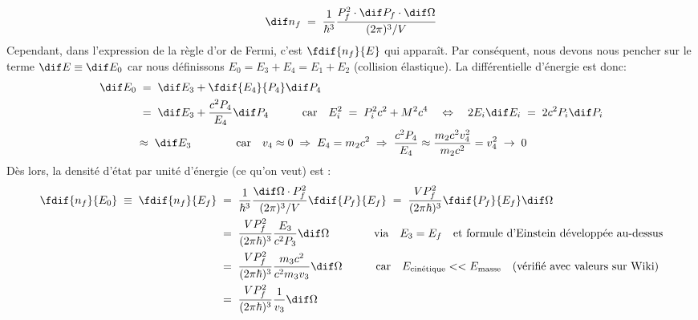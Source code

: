 \[
    \dif n_f \eq \dfrac{1}{\hbar^3}\dfrac{P^{2}_f \cdot \dif P_f \cdot \dif\Omega}{(2\pi)^3 / V}
\]
 Cependant, dans l'expression de la règle d'or de Fermi, c'est $ \fdif{n_f}{E}$ qui apparaît. Par conséquent, nous devons nous pencher sur le terme $\dif E\equiv \dif E_0$ car nous définissons $E_0 = E_3 + E_4 = E_1 + E_2$ (collision élastique). La différentielle d'énergie est donc:
\begin{align*}
    \dif E_0 
        &\eq 
    \dif E_3 + \fdif{E_4}{P_4}\dif P_4\\
        &\eq
    \dif E_3 + \dfrac{c^2 P_4}{E_4}\dif P_4 
    \qquad \quad \text{car} \quad
    E_i^2 \eq P_i^2c^2 + M^2c^4
    \quad \Leftrightarrow \quad
    2E_i\dif E_i \eq 2c^2 P_i \dif P_i\\
        &\approx\;
    \dif E_3  \qquad \qquad \text{car} \quad v_4 \approx 0 \;\Rightarrow\; E_4 = m_2c^2 \;\Rightarrow\; \dfrac{c^2P_4}{E_4} \approx \dfrac{m_2c^2v_4^2}{m_2c^2} = v_4^2 \;\rightarrow\; 0
\end{align*}
Dès lors, la densité d'état par unité d'énergie (ce qu'on veut) est :
\begin{align*}
    \fdif{n_f}{E_0} \;\equiv\; \fdif{n_f}{E_f}
        &\eq
    \dfrac{1}{\hbar^3}\dfrac{ \dif\Omega \cdot P^{2}_f}{(2\pi)^3 / V} \fdif{P_f}{E_f}
    \eq
    \dfrac{V P_f^2}{(2\pi\hbar)^3} \fdif{P_f}{E_f} \dif\Omega
    \\
        &\eq
    \dfrac{V P_f^2}{(2\pi\hbar)^3} \dfrac{E_3}{c^2P_3} \dif\Omega
    \qquad \qquad \text{via} \quad E_3=E_f \quad \text{et formule d'Einstein développée au-dessus} \\ 
        &\eq
    \dfrac{V P_f^2}{(2\pi\hbar)^3}\dfrac{m_3 c^2}{c^2 m_3 v_3}  \dif\Omega
    \qquad \quad \text{car} \quad E_{\text{cinétique}} << E_{\text{masse}} \quad \text{(vérifié avec valeurs sur Wiki)}\\
        &\eq
    \dfrac{V P_f^2}{(2\pi\hbar)^3}\dfrac{1}{v_3}  \dif\Omega
\end{align*}



